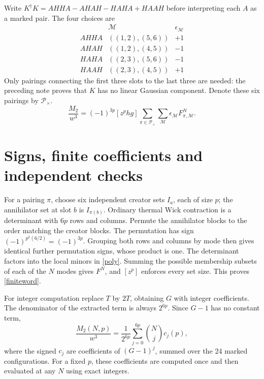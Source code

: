 \documentclass[11pt,a4paper]{article}
\begin{document}
Write $K^\dagger K=AHHA-AHAH-HAHA+HAAH$ before interpreting
each $A$ as a marked pair. The four choices are
\begin{equation}
 \begin{array}{c|c|c}
 &\mathcal M&\epsilon_{\mathcal M}\\\hline
 AHHA&((1,2),(5,6))&+1\\
 AHAH&((1,2),(4,5))&-1\\
 HAHA&((2,3),(5,6))&-1\\
 HAAH&((2,3),(4,5))&+1
 \end{array}
\end{equation}
Only pairings connecting the first three slots to the last three are
needed: the preceding note proves that $K$ has no linear Gaussian
component. Denote these six pairings by $\mathcal P_{\times}$.
\begin{equation}
 \boxed{\frac{M_2}{w^3}=(-1)^{3p}[z^p h g]
   \sum_{\pi\in\mathcal P_{\times}}
   \sum_{\mathcal M}\epsilon_{\mathcal M}F_{\pi,\mathcal M}^N.}\label{exact}
\end{equation}

\newpage
\appendix
\section{Signs, finite coefficients and independent checks}
For a pairing $\pi$, choose six independent creator sets $I_a$, each
of size $p$; the annihilator set at slot $b$ is $I_{\pi(b)}$.
Ordinary thermal Wick contraction is a determinant with $6p$ rows and
columns. Permute the annihilator blocks to the order matching the creator
blocks. The permutation has sign
$(-1)^{p^2(6/2)}=(-1)^{3p}$. Grouping both rows and columns by mode
then gives identical further permutation signs, whose product is one.
The determinant factors into the local minors in \eqref{poly}.
Summing the possible membership subsets of each of the $N$ modes gives
$F^N$, and $[z^p]$ enforces every set size. This proves \eqref{finiteword}.

For integer computation replace $T$ by $2T$, obtaining $G$ with integer
coefficients. The denominator of the extracted term is always $2^{6p}$.
Since $G-1$ has no constant term,
\begin{equation}
 \frac{M_2(N,p)}{w^3}=\frac{1}{2^{6p}}
             \sum_{j=0}^{6p}\binom Nj c_j(p),\label{binomial}
\end{equation}
where the signed $c_j$ are coefficients of $(G-1)^j$, summed over
the 24 marked configurations. For a fixed $p$, these coefficients are
computed once and then evaluated at any $N$ using exact integers.
\end{document}
